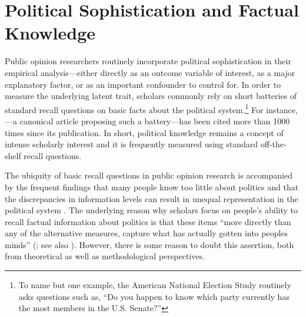 \section*{Political Sophistication and Factual Knowledge}


Public opinion researchers routinely incorporate political sophistication in their empirical analysis---either directly as an outcome variable of interest, as a major explanatory factor, or as an important confounder to control for. In order to measure the underlying latent trait, scholars commonly rely on short batteries of standard recall questions on basic facts about the political system.\footnote{To name but one example, the American National Election Study routinely asks questions such as, ``Do you happen to know which party currently has the most members in the U.S. Senate?''} For instance, \citet{carpini1993measuring}---a canonical article proposing such a battery---has been cited more than 1000 times since its publication. In short, political knowledge remains a concept of intense scholarly interest and it is frequently measured using standard off-the-shelf recall questions.

The ubiquity of basic recall questions in public opinion research is accompanied by the frequent findings that many people know too little about politics \citep{carpini1996americans,barabas2014question} and that the discrepancies in information levels can result in unequal representation in the political system \citep{althaus1998information,kuklinski2000misinformation,gilens2001political}. The underlying reason why scholars focus on people's ability to recall factual information about politics is that these items ``more directly than any of the alternative measures, capture what has actually gotten into peoples minds'' (\citealt[21]{zaller1992nature}; see also \citealt{zaller1991information,gomez2001political}). However, there is some reason to doubt this assertion, both from theoretical as well as methodological perspectives.

